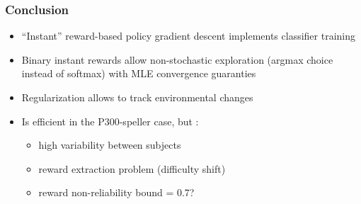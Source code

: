 \documentclass{beamer}
\begin{document}
\begin{frame}\frametitle{Conclusion}
 \begin{itemize}
  \item  ``Instant'' reward-based policy gradient descent implements classifier training
  \item Binary instant rewards allow non-stochastic exploration (argmax choice instead of softmax) with MLE convergence guaranties 
  \item Regularization allows to track environmental changes
  \item  Is efficient in the P300-speller case, but :
    \begin{itemize}
      \item high variability between subjects
      \item reward extraction problem (difficulty shift)
      \item reward non-reliability bound = 0.7?
    \end{itemize}
 \end{itemize}
\end{frame}







\end{document}
